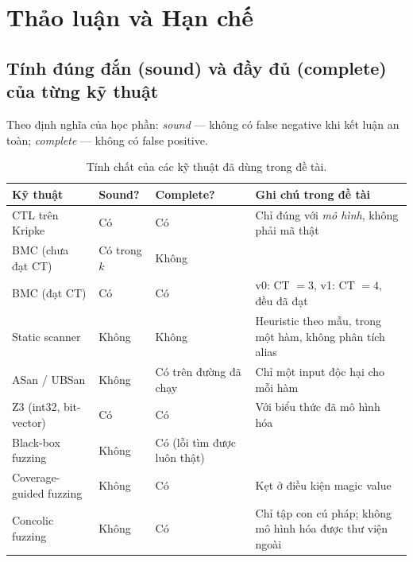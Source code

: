 \chapter{Thảo luận và Hạn chế}
\label{ch:thaoluan}

\section{Tính đúng đắn (sound) và đầy đủ (complete) của từng kỹ thuật}
Theo định nghĩa của học phần: \emph{sound} — không có false negative khi kết luận an toàn;
\emph{complete} — không có false positive.

\begin{table}[H]
\centering\small
\caption{Tính chất của các kỹ thuật đã dùng trong đề tài.}
\label{tab:sound}
\begin{tabularx}{\linewidth}{@{}l l l X@{}}
\toprule
Kỹ thuật & Sound? & Complete? & Ghi chú trong đề tài \\
\midrule
CTL trên Kripke & Có & Có & Chỉ đúng với \emph{mô hình}, không phải mã thật \\
BMC (chưa đạt CT) & Có trong $k$ & Không & \\
BMC (đạt CT) & Có & Có & v0: CT $=3$, v1: CT $=4$, đều đã đạt \\
Static scanner & Không & Không & Heuristic theo mẫu, trong một hàm, không phân tích alias \\
ASan / UBSan & Không & Có trên đường đã chạy & Chỉ một input độc hại cho mỗi hàm \\
Z3 (int32, bit-vector) & Có & Có & Với biểu thức đã mô hình hóa \\
Black-box fuzzing & Không & Có (lỗi tìm được luôn thật) & \\
Coverage-guided fuzzing & Không & Có & Kẹt ở điều kiện magic value \\
Concolic fuzzing & Không & Có & Chỉ tập con cú pháp; không mô hình hóa được thư viện ngoài \\
\bottomrule
\end{tabularx}
\end{table}

